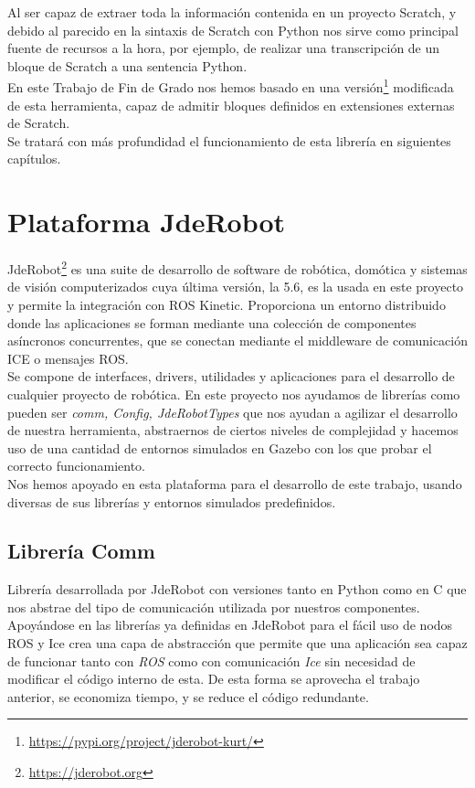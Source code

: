 Al ser capaz de extraer toda la información contenida en un proyecto Scratch, y debido al parecido en la sintaxis de Scratch con Python nos sirve como principal fuente de recursos a la hora, por ejemplo, de realizar una transcripción de un bloque de Scratch a una sentencia Python.\\

En este Trabajo de Fin de Grado nos hemos basado en una versión\footnote{\url{https://pypi.org/project/jderobot-kurt/}} modificada de esta herramienta, capaz de admitir bloques definidos en extensiones externas de Scratch.\\

Se tratará con más profundidad el funcionamiento de esta librería en siguientes capítulos.




\section{Plataforma JdeRobot}
\label{sec:jderobot}
JdeRobot\footnote{\url{https://jderobot.org}} es una suite de desarrollo de software de robótica, domótica y sistemas de visión computerizados cuya última versión, la 5.6, es la usada en este proyecto y permite la integración con ROS Kinetic. Proporciona un entorno distribuido donde las aplicaciones se forman mediante una colección de componentes asíncronos concurrentes, que se conectan mediante el middleware de comunicación ICE o mensajes ROS.\\

Se compone de interfaces, drivers, utilidades y aplicaciones para el desarrollo de cualquier proyecto de robótica. En este proyecto nos ayudamos de librerías como pueden ser \textit{comm, Config, JdeRobotTypes} que nos ayudan a agilizar el desarrollo de nuestra herramienta, abstraernos de ciertos niveles de complejidad y hacemos uso de una cantidad de entornos simulados en Gazebo con los que probar el correcto funcionamiento.\\

Nos hemos apoyado en esta plataforma para el desarrollo de este trabajo, usando diversas de sus librerías y entornos simulados predefinidos.


\subsection{Librería Comm}
\label{sec:libreria-com}
Librería desarrollada por JdeRobot con versiones tanto en Python como en C que nos abstrae del tipo de comunicación utilizada por nuestros componentes. Apoyándose en las librerías ya definidas en JdeRobot para el fácil uso de nodos ROS y Ice crea una capa de abstracción que permite que una aplicación sea capaz de funcionar tanto con \textit{ROS} como con comunicación \textit{Ice} sin necesidad de modificar el código interno de esta. De esta forma se aprovecha el trabajo anterior, se economiza tiempo, y se reduce el código redundante.\\

